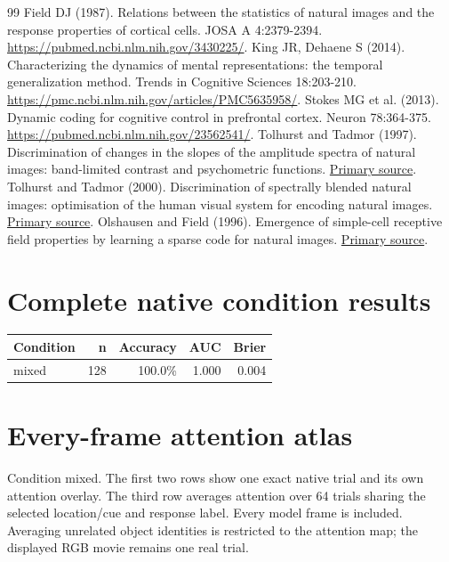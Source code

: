 \documentclass[11pt]{article}
\begin{document}
\begin{thebibliography}{99}
 Field DJ (1987). Relations between the statistics of natural images and the response properties of cortical cells. JOSA A 4:2379-2394. \url{https://pubmed.ncbi.nlm.nih.gov/3430225/}.
 King JR, Dehaene S (2014). Characterizing the dynamics of mental representations: the temporal generalization method. Trends in Cognitive Sciences 18:203-210. \url{https://pmc.ncbi.nlm.nih.gov/articles/PMC5635958/}.
 Stokes MG et al. (2013). Dynamic coding for cognitive control in prefrontal cortex. Neuron 78:364-375. \url{https://pubmed.ncbi.nlm.nih.gov/23562541/}.
 Tolhurst and Tadmor (1997). Discrimination of changes in the slopes of the amplitude spectra of natural images: band-limited contrast and psychometric functions. \href{https://pubmed.ncbi.nlm.nih.gov/9509160/}{Primary source}.
 Tolhurst and Tadmor (2000). Discrimination of spectrally blended natural images: optimisation of the human visual system for encoding natural images. \href{https://pubmed.ncbi.nlm.nih.gov/11144821/}{Primary source}.
 Olshausen and Field (1996). Emergence of simple-cell receptive field properties by learning a sparse code for natural images. \href{https://www.nature.com/articles/381607a0}{Primary source}.
\end{thebibliography}\clearpage\appendix\section{Complete native condition results}
\small\begin{longtable}{p{}rrrr}\toprule Condition & n & Accuracy & AUC & Brier\\\midrule\endhead
mixed & 128 & 100.0\% & 1.000 & 0.004\\
\bottomrule\end{longtable}\normalsize\section{Every-frame attention atlas}
Condition mixed. The first two rows show one exact native trial and its own attention overlay. The third row averages attention over 64 trials sharing the selected location/cue and response label. Every model frame is included. Averaging unrelated object identities is restricted to the attention map; the displayed RGB movie remains one real trial.
\end{document}
